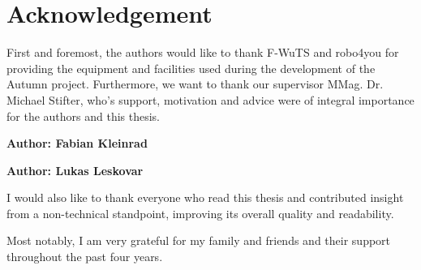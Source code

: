 \chapter{Acknowledgement}

First and foremost, the authors would like to thank F-WuTS and robo4you for providing the equipment and facilities used during the development of the Autumn project. Furthermore, we want to thank our supervisor MMag. Dr. Michael Stifter, who's support, motivation and advice were of integral importance for the authors and this thesis.\linebreak

\textbf{Author: Fabian Kleinrad }


\textbf{Author: Lukas Leskovar}


I would also like to thank everyone who read this thesis and contributed insight from a non-technical standpoint, improving its overall quality and readability. 

Most notably, I am very grateful for my family and friends and their support throughout the past four years. 